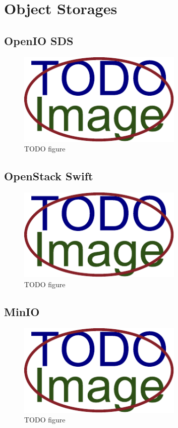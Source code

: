 \chapter{Object Storages}
    \textcolor{gray}{\Blindtext}
\section{OpenIO SDS}
    \textcolor{gray}{\Blindtext}
    \begin{figure}[hbt]
        \centering
        \includegraphics[width=0.7\textwidth]{obrazky-figures/placeholder.pdf}
        \caption{TODO figure}
    \end{figure}
\section{OpenStack Swift}
    \textcolor{gray}{\Blindtext}
    \begin{figure}[hbt]
        \centering
        \includegraphics[width=0.7\textwidth]{obrazky-figures/placeholder.pdf}
        \caption{TODO figure}
    \end{figure}
\section{MinIO}
    \textcolor{gray}{\Blindtext}
    \begin{figure}[hbt]
        \centering
        \includegraphics[width=0.7\textwidth]{obrazky-figures/placeholder.pdf}
        \caption{TODO figure}
    \end{figure}

